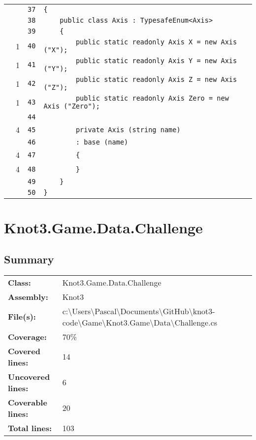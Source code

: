 \documentclass[a4paper,10pt]{article}
\begin{document}
\begin{longtable}[l]{lrrl}
\cellcolor{gray} &  & \verb~37~ & \verb~{~\\
\cellcolor{gray} &  & \verb~38~ & \verb~    public class Axis : TypesafeEnum<Axis>~\\
\cellcolor{gray} &  & \verb~39~ & \verb~    {~\\
\cellcolor{green} & 1 & \verb~40~ & \verb~        public static readonly Axis X = new Axis ("X");~\\
\cellcolor{green} & 1 & \verb~41~ & \verb~        public static readonly Axis Y = new Axis ("Y");~\\
\cellcolor{green} & 1 & \verb~42~ & \verb~        public static readonly Axis Z = new Axis ("Z");~\\
\cellcolor{green} & 1 & \verb~43~ & \verb~        public static readonly Axis Zero = new Axis ("Zero");~\\
\cellcolor{gray} &  & \verb~44~ & \verb~~\\
\cellcolor{green} & 4 & \verb~45~ & \verb~        private Axis (string name)~\\
\cellcolor{gray} &  & \verb~46~ & \verb~        : base (name)~\\
\cellcolor{green} & 4 & \verb~47~ & \verb~        {~\\
\cellcolor{green} & 4 & \verb~48~ & \verb~        }~\\
\cellcolor{gray} &  & \verb~49~ & \verb~    }~\\
\cellcolor{gray} &  & \verb~50~ & \verb~}~\\
\end{longtable}
\newpage
\section{Knot3.Game.Data.Challenge}
\subsection{Summary}
\begin{longtable}[l]{ll}
\textbf{Class:} & Knot3.Game.Data.Challenge\\
\textbf{Assembly:} & Knot3\\
\textbf{File(s):} & \begin{minipage}[t]{12cm}{c:\textbackslash Users\textbackslash Pascal\textbackslash Documents\textbackslash GitHub\textbackslash knot3-code\textbackslash Game\textbackslash Knot3.Game\textbackslash Data\textbackslash Challenge.cs}\end{minipage} \\
\textbf{Coverage:} & 70\%\\
\textbf{Covered lines:} & 14\\
\textbf{Uncovered lines:} & 6\\
\textbf{Coverable lines:} & 20\\
\textbf{Total lines:} & 103\\
\end{longtable}
\end{document}
